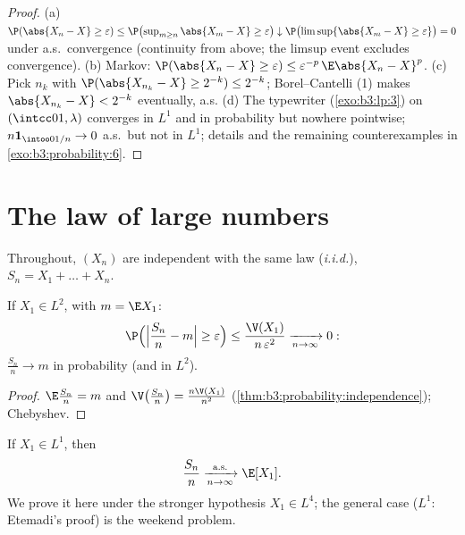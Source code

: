 \begin{proof}
(a) $\P(\abs{X_n - X} \geq \varepsilon) \leq
\P\bigl(\sup_{m\geq n}\abs{X_m - X} \geq \varepsilon\bigr)
\downarrow \P\bigl(\limsup\{\abs{X_m - X} \geq
\varepsilon\}\bigr) = 0$ under a.s.\ convergence (continuity
from above; the limsup event excludes convergence). (b)
Markov: $\P(\abs{X_n - X} \geq \varepsilon) \leq
\varepsilon^{-p}\,\E\abs{X_n - X}^p$. (c) Pick $n_k$ with
$\P(\abs{X_{n_k} - X} \geq 2^{-k}) \leq 2^{-k}$;
Borel--Cantelli (1) makes $\abs{X_{n_k} - X} < 2^{-k}$
eventually, a.s. (d) The typewriter (\cref{exo:b3:lp:3}) on
$(\intcc01, \lambda)$ converges in $L^1$ and in probability
but nowhere pointwise; $n\mathbf 1_{\intoo0{1/n}} \to 0$
a.s.\ but not in $L^1$; details and the remaining
counterexamples in \cref{exo:b3:probability:6}.
\end{proof}

\section{The law of large numbers}

Throughout, $(X_n)$ are independent with the same law
(\emph{i.i.d.}), $S_n = X_1 + \dots + X_n$.

\begin{theorem}
\label{thm:b3:probability:wlln}
If $X_1 \in L^2$, with $m = \E X_1$:
\[
\P\Bigl(\Bigl|\frac{S_n}{n} - m\Bigr| \geq
\varepsilon\Bigr) \leq
\frac{\V(X_1)}{n\,\varepsilon^2}
\xrightarrow[n\to\infty]{} 0 :
\]
$\frac{S_n}n \to m$ in probability (and in $L^2$).
\end{theorem}

\begin{proof}
$\E\frac{S_n}n = m$ and $\V\bigl(\frac{S_n}n\bigr) =
\frac{n\V(X_1)}{n^2}$
(\cref{thm:b3:probability:independence}); Chebyshev.
\end{proof}

\begin{theorem}
\label{thm:b3:probability:slln}
If $X_1 \in L^1$, then
\[
\frac{S_n}{n} \xrightarrow[n\to\infty]{\text{a.s.}} \E[X_1].
\]
We prove it here under the stronger hypothesis $X_1 \in
L^4$; the general case ($L^1$: Etemadi's proof) is the
weekend problem.
\end{theorem}


